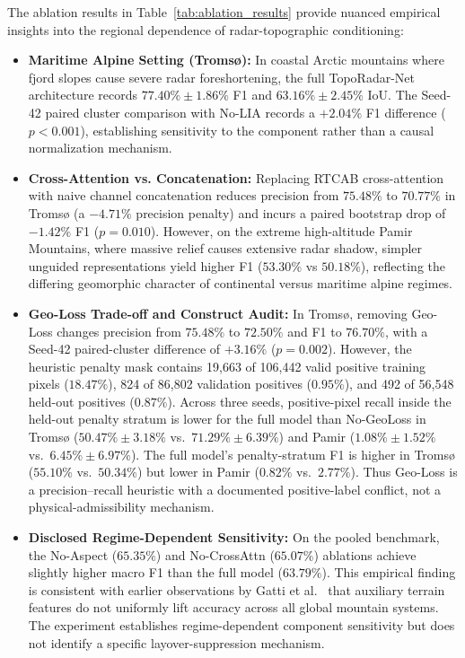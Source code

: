 The ablation results in Table~\ref{tab:ablation_results} provide nuanced empirical insights into the regional dependence of radar-topographic conditioning:
\begin{itemize}
    \item \textbf{Maritime Alpine Setting (Troms{\o}):} In coastal Arctic mountains where fjord slopes cause severe radar foreshortening, the full TopoRadar-Net architecture records $77.40\% \pm 1.86\%$ F1 and $63.16\% \pm 2.45\%$ IoU. The Seed-42 paired cluster comparison with No-LIA records a $+2.04\%$ F1 difference ($p < 0.001$), establishing sensitivity to the component rather than a causal normalization mechanism.
    \item \textbf{Cross-Attention vs. Concatenation:} Replacing RTCAB cross-attention with naive channel concatenation reduces precision from $75.48\%$ to $70.77\%$ in Troms{\o} (a $-4.71\%$ precision penalty) and incurs a paired bootstrap drop of $-1.42\%$ F1 ($p = 0.010$). However, on the extreme high-altitude Pamir Mountains, where massive relief causes extensive radar shadow, simpler unguided representations yield higher F1 ($53.30\%$ vs $50.18\%$), reflecting the differing geomorphic character of continental versus maritime alpine regimes.
    \item \textbf{Geo-Loss Trade-off and Construct Audit:} In Troms{\o}, removing Geo-Loss changes precision from $75.48\%$ to $72.50\%$ and F1 to $76.70\%$, with a Seed-42 paired-cluster difference of $+3.16\%$ ($p = 0.002$). However, the heuristic penalty mask contains 19,663 of 106,442 valid positive training pixels ($18.47\%$), 824 of 86,802 validation positives ($0.95\%$), and 492 of 56,548 held-out positives ($0.87\%$). Across three seeds, positive-pixel recall inside the held-out penalty stratum is lower for the full model than No-GeoLoss in Troms{\o} ($50.47\% \pm 3.18\%$ vs.\ $71.29\% \pm 6.39\%$) and Pamir ($1.08\% \pm 1.52\%$ vs.\ $6.45\% \pm 6.97\%$). The full model's penalty-stratum F1 is higher in Troms{\o} ($55.10\%$ vs.\ $50.34\%$) but lower in Pamir ($0.82\%$ vs.\ $2.77\%$). Thus Geo-Loss is a precision--recall heuristic with a documented positive-label conflict, not a physical-admissibility mechanism.
    \item \textbf{Disclosed Regime-Dependent Sensitivity:} On the pooled benchmark, the No-Aspect ($65.35\%$) and No-CrossAttn ($65.07\%$) ablations achieve slightly higher macro F1 than the full model ($63.79\%$). This empirical finding is consistent with earlier observations by Gatti et al.~\citep{gatti2026avalanche} that auxiliary terrain features do not uniformly lift accuracy across all global mountain systems. The experiment establishes regime-dependent component sensitivity but does not identify a specific layover-suppression mechanism.
\end{itemize}

